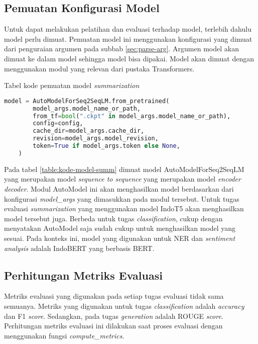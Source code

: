 \subsection{Pemuatan Konfigurasi Model}

Untuk dapat melakukan pelatihan dan evaluasi terhadap model, terlebih dahulu model perlu dimuat. Pemuatan model ini menggunakan konfigurasi yang dimuat dari penguraian argumen pada subbab \ref{sec:parse-arg}. Argumen model akan dimuat ke dalam model sehingga model bisa dipakai. Model akan dimuat dengan menggunakan modul yang relevan dari pustaka Transformers.

\begin{table}
    \caption{Tabel kode pemuatan model \textit{summarization}}
    \label{table:kode-model-summ}
    \begin{lstlisting}[language=python]
    model = AutoModelForSeq2SeqLM.from_pretrained(
        model_args.model_name_or_path,
        from_tf=bool(".ckpt" in model_args.model_name_or_path),
        config=config,
        cache_dir=model_args.cache_dir,
        revision=model_args.model_revision,
        token=True if model_args.token else None,
    )
    \end{lstlisting}
\end{table}

Pada tabel \ref{table:kode-model-summ} dimuat model AutoModelForSeq2SeqLM yang merupakan model \textit{sequence to sequence} yang merupakan model \textit{encoder decoder}. Modul AutoModel ini akan menghasilkan model berdasarkan dari konfigurasi \textit{model\_args} yang dimasukkan pada modul tersebut. Untuk tugas evaluasi \textit{summarization} yang menggunakan model IndoT5 akan menghasilkan model tersebut juga. Berbeda untuk tugas \textit{classification}, cukup dengan menyatakan AutoModel saja sudah cukup untuk menghasilkan model yang sesuai. Pada konteks ini, model yang digunakan untuk NER dan \textit{sentiment analysis} adalah IndoBERT yang berbasis BERT.

\subsection{Perhitungan Metriks Evaluasi}
\label{sec:metriks-evaluasi}

Metriks evaluasi yang digunakan pada setiap tugas evaluasi tidak sama semuanya. Metriks yang digunakan untuk tugas \textit{classification} adalah \textit{accuracy} dan F1 \textit{score}. Sedangkan, pada tugas \textit{generation} adalah ROUGE \textit{score}. Perhitungan metriks evaluasi ini dilakukan saat proses evaluasi dengan menggunakan fungsi \textit{compute\_metrics}.


